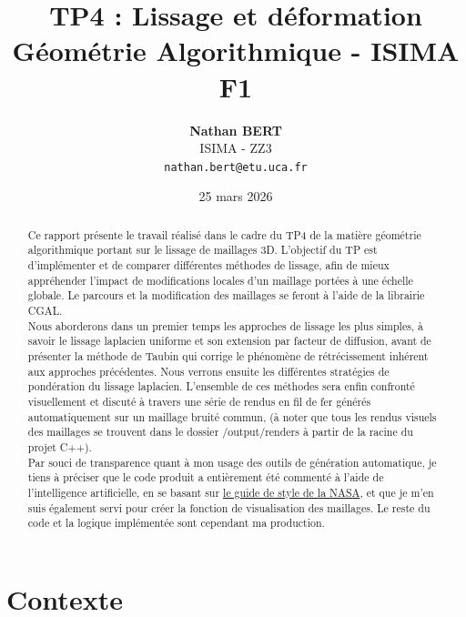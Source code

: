 \documentclass[11pt,a4paper]{article}
\title{
    \vspace{-2cm}
    \textbf{TP4 : Lissage et déformation}\\
    \large Géométrie Algorithmique - ISIMA F1
}
\author{
    \textbf{Nathan BERT}\\
    \small ISIMA - ZZ3\\
    \small \texttt{nathan.bert@etu.uca.fr}
}
\date{25 mars 2026}
\begin{document}
\maketitle
\vspace{4cm}

\begin{abstract}
Ce rapport présente le travail réalisé dans le cadre du TP4 de la matière géométrie algorithmique portant 
sur le lissage de maillages 3D. L'objectif du TP est d'implémenter et de comparer différentes méthodes de lissage,
afin de mieux appréhender l'impact de modifications locales d'un maillage portées à une échelle globale.
Le parcours et la modification des maillages se feront à l'aide de la librairie CGAL.\\
Nous aborderons dans un premier temps les approches de lissage les plus simples, à savoir le lissage laplacien uniforme
et son extension par facteur de diffusion, avant de présenter la méthode de Taubin qui corrige le phénomène
de rétrécissement inhérent aux approches précédentes. Nous verrons ensuite les différentes stratégies de pondération
du lissage laplacien. L'ensemble de ces méthodes sera enfin confronté 
visuellement et discuté à travers une série de rendus en fil de fer générés automatiquement sur un maillage bruité commun, (à noter que tous les rendus visuels des maillages se trouvent dans le dossier /output/renders à partir de la racine du projet C++).\\
Par souci de transparence quant à mon usage des outils de génération automatique, je tiens à préciser que le code
produit a entièrement été commenté à l'aide de l'intelligence artificielle, en se basant sur \href{https://ntrs.nasa.gov/citations/20080039927}{le guide de style de la NASA},
et que je m'en suis également servi pour créer la fonction de visualisation des maillages. 
Le reste du code et la logique implémentée sont cependant ma production.
\end{abstract}
\newpage

\tableofcontents
\newpage
\listoffigures

\newpage

\section{Contexte}
\end{document}
